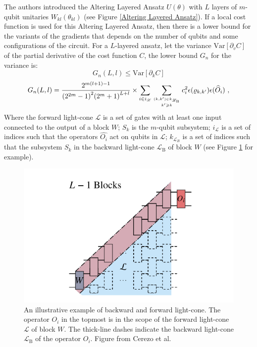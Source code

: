 The authors introduced the Altering Layered Ansatz $U(\theta)$ with $L$ layers of $m$-qubit unitaries $W_{kl}(\theta_{kl})$ (see Figure \ref{Altering Layered Ansatz}).
If a local cost function is used for this Altering Layered Ansatz, then there is a lower bound for the variants of the gradients that depends on the number of qubits and some configurations of the circuit. 
For a $L$-layered ansatz, let the variance $\mathrm{Var}[\partial_v C]$ of the partial derivative of the cost function $C$, the lower bound $G_n$ for the variance is:
\begin{equation}
    G_n(L,l) \leq \mathrm{Var}[\partial_k C]
\end{equation}
\begin{equation}
    G_n(L,l) = \frac{{2}^{m(l+1)-1}}{{({2}^{2m}-1)}^{2}{({2}^{m}+1)}^{L+l}}
    \times \mathop{\sum}\limits_{i\in {i}_{{\mathcal{L}}}}\mathop{\sum}\limits _{{(k,k^{\prime} )\in {k}_{{{\mathcal{L}}}_{\text{B}}}}\atop {k^{\prime} \geqslant k}}{c}_{i}^{2}\epsilon ({\rho }_{k,k^{\prime} })\epsilon ({\widehat{O}}_{i})\ ,
\end{equation}
Where the forward light-cone $\mathcal{L}$ is a set of gates with at least one input connected to the output of a block $W$; 
$S_k$ is the $m$-qubit subsystem;
$i_{\mathcal{L}}$ is a set of indices such that the operators $\hat{O_i}$ act on qubits in $\mathcal{L}$;
$k_{\mathcal{L}_B}$ is a set of indices such that the subsystem $S_k$ in the backward light-cone $\mathcal{L}_\text{B}$ of block $W$ (see Figure \ref{Forward-backward light cone} for example).
\begin{figure}
    \centering
    \includegraphics[scale=0.5]{LiteratureReview/Appendices/lightcone.png}
    \caption{
        An illustrative example of backward and forward light-cone.
        The operator $O_i$ in the topmost is in the scope of the forward light-cone $\mathcal{L}$ of block $W$.
        The thick-line dashes indicate the backward light-cone $\mathcal{L}_{\text{B}}$ of the operator $O_i$.
        Figure from Cerezo et al. \cite{cerezoCostFunctionDependent2021}
    }
    \label{Forward-backward light cone}
\end{figure}

